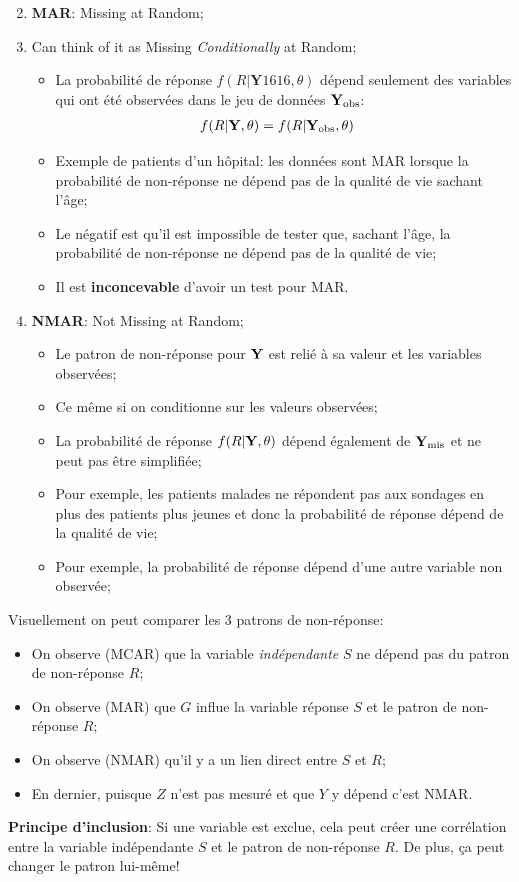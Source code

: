 \documentclass[10pt, french]{article}
\begin{document}
\begin{multicols*}{3}
\begin{enumerate}
\end{enumerate}
\begin{enumerate}
	\setcounter{enumi}{1}
	\item	\textbf{MAR}: Missing at Random;
	\item[]	Can think of it as Missing \textit{Conditionally} at Random;
		\begin{itemize}[leftmargin = *]
		\item	La probabilité de réponse $f(R | \bm{Y}1616, \theta)$ dépend seulement des variables qui ont été observées dans le jeu de données $\mathbf{Y}_{\text{obs}}$:
			\begin{align*}
			f(R | \mathbf{Y}, \theta) &= f(R | \mathbf{Y}_{\text{obs}}, \theta) 
			\end{align*}
		\item	Exemple de patients d'un hôpital: les données sont MAR lorsque la probabilité de non-réponse ne dépend pas de la qualité de vie sachant l'âge;
		\item	Le négatif est qu'il est impossible de tester que, sachant l'âge, la probabilité de non-réponse ne dépend pas de la qualité de vie;
		\item	Il est \textbf{inconcevable} d'avoir un test pour MAR.
		\end{itemize}
	\item	\textbf{NMAR}: Not Missing at Random;
		\begin{itemize}[leftmargin = *]
		\item	Le patron de non-réponse pour $\mathbf{Y}$ est relié à sa valeur et les variables observées;
		\item[]	Ce même si on conditionne sur les valeurs observées;
		\item	La probabilité de réponse $f(R | \mathbf{Y}, \theta)$ dépend également de $\mathbf{Y}_{\text{mis}}$ et ne peut pas être simplifiée;
		\item	Pour exemple, les patients malades ne répondent pas aux sondages en plus des patients plus jeunes et donc la probabilité de réponse dépend de la qualité de vie;
		\item	Pour exemple, la probabilité de réponse dépend d'une autre variable non observée;
		\end{itemize}
\end{enumerate}

Visuellement on peut comparer les 3 patrons de non-réponse:
\begin{itemize}
	\item	On observe (MCAR) que la variable \textit{indépendante} $S$ ne dépend pas du patron de non-réponse $R$;
	\item	On observe (MAR) que $G$ influe la variable réponse $S$ et le patron de non-réponse $R$;
	\item	On observe (NMAR) qu'il y a un lien direct entre $S$ et $R$;
	\item	En dernier, puisque $Z$ n'est pas mesuré et que $Y$ y dépend c'est NMAR.
\end{itemize}
\textbf{Principe d'inclusion}: Si une variable est exclue, cela peut créer une corrélation entre la variable indépendante $S$ et le patron de non-réponse $R$. De plus, ça peut changer le patron lui-même!


\end{multicols*}
\end{document}
